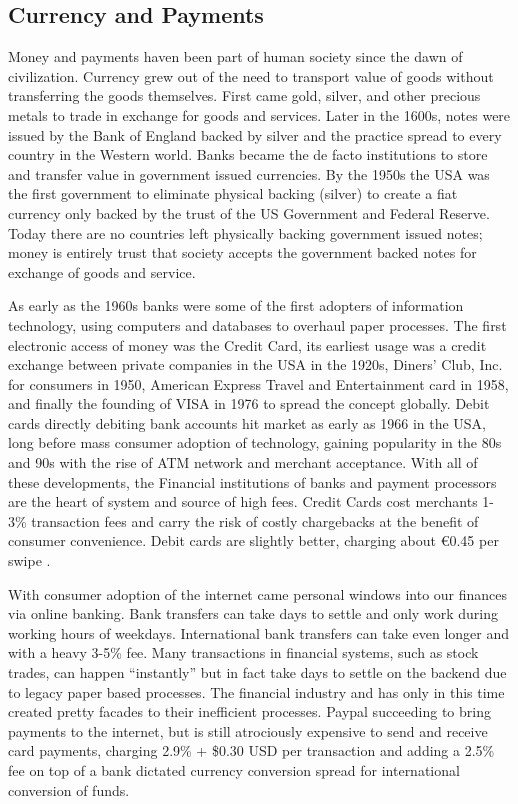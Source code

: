 \documentclass[a4paper,12pt]{article} %
\begin{document}
\subsection{Currency and Payments} \label{ssec:2:finance}

Money and payments haven been part of human society since the dawn of civilization. Currency grew out of the need to transport value of goods without transferring the goods themselves. First came gold, silver, and other precious metals to trade in exchange for goods and services. Later in the 1600s, notes were issued by the Bank of England backed by silver and the practice spread to every country in the Western world. Banks became the de facto institutions to store and transfer value in government issued currencies. By the 1950s the USA was the first government to eliminate physical backing (silver) to create a fiat currency only backed by the trust of the US Government and Federal Reserve. Today there are no countries left physically backing government issued notes; money is entirely trust that society accepts the government backed notes for exchange of goods and service.

As early as the 1960s banks were some of the first adopters of information technology, using computers and databases to overhaul paper processes. The first electronic access of money was the Credit Card, its earliest usage was a credit exchange between private companies in the USA in the 1920s, Diners’ Club, Inc. for consumers in 1950, American Express Travel and Entertainment card in 1958, and finally the founding of VISA in 1976 to spread the concept globally\cite{britannica2016creditcard}. Debit cards directly debiting bank accounts hit market as early as 1966 in the USA, long before mass consumer adoption of technology, gaining popularity in the 80s and 90s with the rise of ATM network and merchant acceptance\cite{collins2011debitcard}. With all of these developments, the Financial institutions of banks and payment processors are the heart of system and source of high fees. Credit Cards cost  merchants 1-3\% transaction fees and carry the risk of costly chargebacks at the benefit of consumer convenience. Debit cards are slightly better, charging about \euro0.45 per swipe \cite{kaarmann2014government}.

With consumer adoption of the internet came personal windows into our finances via online banking. Bank transfers can take days to settle and only work during working hours of weekdays. International bank transfers can take even longer and with a heavy 3-5\% fee.  Many transactions in financial systems, such as stock trades, can happen ``instantly'' but in fact take days to settle on the backend due to legacy paper based processes. The financial industry and has only in this time created pretty facades to their inefficient processes. Paypal succeeding to bring payments to the internet, but is still atrociously expensive to send and receive card payments, charging 2.9\% + \$0.30 USD per transaction and adding a 2.5\% fee on top of a bank dictated currency conversion spread for international conversion of funds\cite{paypal2017fees}.
\end{document}

